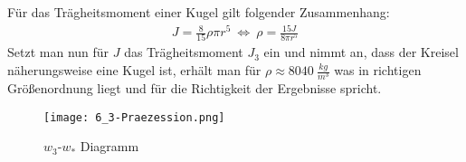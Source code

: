 Für das Trägheitsmoment einer Kugel gilt folgender Zusammenhang:
\begin{align}
    J=\frac{8}{15}\rho\pi r^5 ~\Leftrightarrow~ \rho=\frac{15 J}{8\pi r^5}
\end{align}
Setzt man nun für $J$ das Trägheitsmoment $J_3$ ein und nimmt an, dass der Kreisel näherungsweise eine Kugel ist, erhält man für $\rho\approx8040~\frac{kg}{m^3}$ was in richtigen Größenordnung liegt und für die Richtigkeit der Ergebnisse spricht.
\newpage
\begin{figure}[ht]
    \centering
    \caption{$w_3$-$w_*$ Diagramm}
    \texttt{[image: 6\_3-Praezession.png]}
\end{figure}
